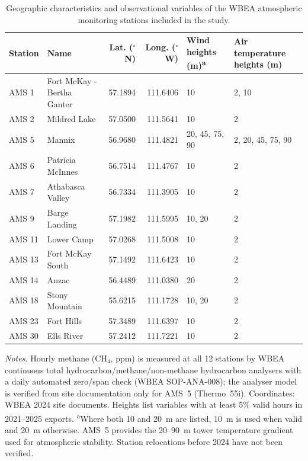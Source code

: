 \begin{table}[t]
\centering
\caption{Geographic characteristics and observational variables of the WBEA atmospheric monitoring stations included in the study.}
\label{tab:stations}
\small
\begin{tabular}{llrrll}
\toprule
Station & Name & Lat. ($^\circ$N) & Long. ($^\circ$W) & Wind heights (m)\textsuperscript{a} & Air temperature heights (m) \\
\midrule
AMS 1 & Fort McKay - Bertha Ganter & 57.1894 & 111.6406 & 10 & 2, 10 \\
AMS 2 & Mildred Lake & 57.0500 & 111.5641 & 10 & 2 \\
AMS 5 & Mannix & 56.9680 & 111.4821 & 20, 45, 75, 90 & 2, 20, 45, 75, 90 \\
AMS 6 & Patricia McInnes & 56.7514 & 111.4767 & 10 & 2 \\
AMS 7 & Athabasca Valley & 56.7334 & 111.3905 & 10 & 2 \\
AMS 9 & Barge Landing & 57.1982 & 111.5995 & 10, 20 & 2 \\
AMS 11 & Lower Camp & 57.0268 & 111.5008 & 10 & 2 \\
AMS 13 & Fort McKay South & 57.1492 & 111.6423 & 10 & 2 \\
AMS 14 & Anzac & 56.4489 & 111.0380 & 20 & 2 \\
AMS 18 & Stony Mountain & 55.6215 & 111.1728 & 10, 20 & 2 \\
AMS 23 & Fort Hills & 57.3489 & 111.6397 & 10 & 2 \\
AMS 30 & Ells River & 57.2412 & 111.7221 & 10 & 2 \\
\bottomrule
\end{tabular}
\par\smallskip\footnotesize
\textit{Notes.} Hourly methane (CH$_4$, ppm) is measured at all 12 stations by WBEA continuous total hydrocarbon/methane/non-methane hydrocarbon analysers with a daily automated zero/span check (WBEA SOP-ANA-008); the analyser model is verified from site documentation only for AMS~5 (Thermo~55i). Coordinates: WBEA 2024 site documents. Heights list variables with at least 5\% valid hours in 2021--2025 exports. \textsuperscript{a}Where both 10 and 20~m are listed, 10~m is used when valid and 20~m otherwise. AMS~5 provides the 20--90~m tower temperature gradient used for atmospheric stability. Station relocations before 2024 have not been verified.
\end{table}
